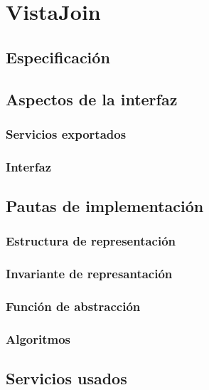 \section{VistaJoin}

\subsection{Especificación}

\subsection{Aspectos de la interfaz}

\subsubsection{Servicios exportados}

\subsubsection{Interfaz}

\subsection{Pautas de implementación}

\subsubsection{Estructura de representación}

\subsubsection{Invariante de represantación}

\subsubsection{Función de abstracción}

\subsubsection{Algoritmos}

\subsection{Servicios usados}

